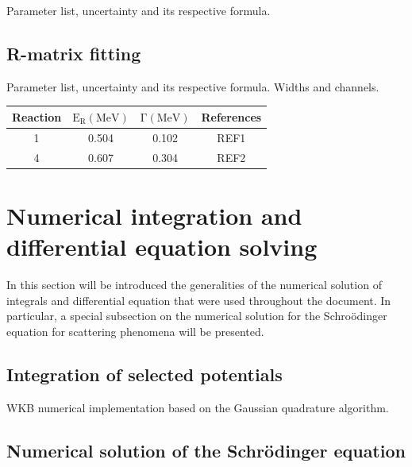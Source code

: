 \documentclass[openany]{book}
\begin{document}
Parameter list, uncertainty and its respective formula.

\cite{gontchar_chushnyakova_2016}

\section{R-matrix fitting} \label{sec:rmatrixFitting}

Parameter list, uncertainty and its respective formula. Widths and channels.


\begin{table}[H]
	\centering
	\begin{tabular}{|c|c|c|c|}
		\hline
		Reaction & $\mathrm{E_R(MeV)}$ &  $\mathrm{\Gamma(MeV)}$ & References  \\  \hline
		1 &  0.504 & 0.102  & REF1  \\
 		4 &  0.607 & 0.304 & REF2 \\
 		\hline
	\end{tabular}
\end{table}



\cite{descouvemont_2016}
\cite{thompson_deboer_dimitriou_kunieda_pigni_arbanas_leeb_srdinko_hale_tamagno_et_2019}
\cite{azuma_uberseder_simpson_brune_costantini_deboer_gorres_heil_leblanc_ugalde_et_2010}

\chapter{Numerical integration and differential equation solving} \label{ap:numericalSolving}


In this section will be introduced the generalities of the numerical solution of integrals and differential equation that were used throughout the document. In particular, a special subsection on the numerical solution for the Schroödinger equation for scattering phenomena will be presented. 

\section{Integration of selected potentials} \label{sec:integrationPotentials}

WKB numerical implementation based on the Gaussian quadrature algorithm.


\section{Numerical solution of the Schrödinger equation} \label{sec:schrodingerSolution}
\end{document}
